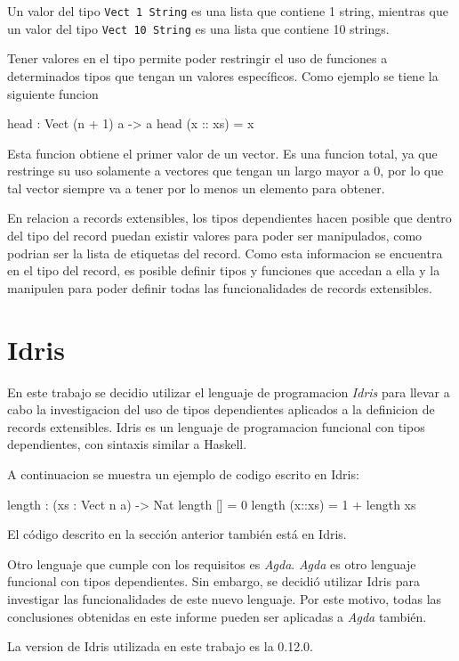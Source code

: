 Un valor del tipo \texttt{Vect 1 String} es una lista que contiene 1 string, mientras que un valor del tipo \texttt{Vect 10 String} es una lista que contiene 10 strings.

Tener valores en el tipo permite poder restringir el uso de funciones a determinados tipos que tengan un valores específicos. Como ejemplo se tiene la siguiente funcion

\begin{code}
head : Vect (n + 1) a -> a
head (x :: xs) = x
\end{code}

Esta funcion obtiene el primer valor de un vector. Es una funcion total, ya que restringe su uso solamente a vectores que tengan un largo mayor a 0, por lo que tal vector siempre va a tener por lo menos un elemento para obtener.

En relacion a records extensibles, los tipos dependientes hacen posible que dentro del tipo del record puedan existir valores para poder ser manipulados, como podrian ser la lista de etiquetas del record. Como esta informacion se encuentra en el tipo del record, es posible definir tipos y funciones que accedan a ella y la manipulen para poder definir todas las funcionalidades de records extensibles.

\section{Idris}

En este trabajo se decidio utilizar el lenguaje de programacion \textit{Idris} para llevar a cabo la investigacion del uso de tipos dependientes aplicados a la definicion de records extensibles. Idris es un lenguaje de programacion funcional con tipos dependientes, con sintaxis similar a Haskell.

A continuacion se muestra un ejemplo de codigo escrito en Idris:
\begin{code}
length : (xs : Vect n a) -> Nat
length [] = 0
length (x::xs) = 1 + length xs
\end{code}

El código descrito en la sección anterior también está en Idris.

Otro lenguaje que cumple con los requisitos es \textit{Agda}. \textit{Agda} es otro lenguaje funcional con tipos dependientes. Sin embargo, se decidió utilizar Idris para investigar las funcionalidades de este nuevo lenguaje.
Por este motivo, todas las conclusiones obtenidas en este informe pueden ser aplicadas a \textit{Agda} también.

La version de Idris utilizada en este trabajo es la 0.12.0.
